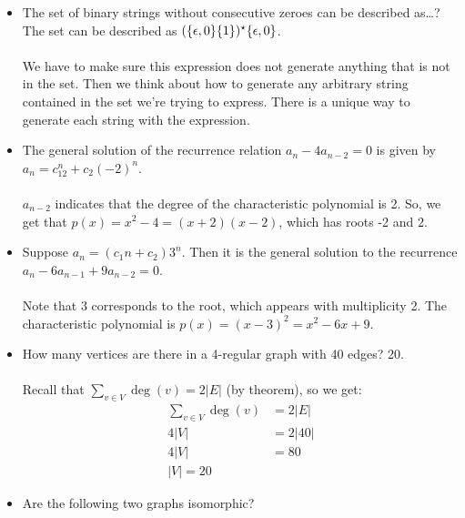 \documentclass[]{article}
\theoremstyle{definition}
\newcommand{\lecture}[1]{\marginpar{{\footnotesize $\leftarrow$ \underline{#1}}}}
\DeclarePairedDelimiter{\set}{\lbrace}{\rbrace}
\begin{document}
\begin{itemize}
			\item The set of binary strings without consecutive zeroes can be described as\dots? The set can be described as $(\set{\epsilon, 0}\set{1 })^\star \set{\epsilon, 0 }$.
				\\ \\
				We have to make sure this expression does not generate anything that is not in the set. Then we think about how to generate any arbitrary string contained in the set we're trying to express. There is a unique way to generate each string with the expression.
			\item \lecture{February 27, 2013} The general solution of the recurrence relation $a_n - 4a_{n - 2} = 0$ is given by $a_n = c_12^n + c_2(-2)^n$.
				\\ \\
				$a_{n - 2}$ indicates that the degree of the characteristic polynomial is 2. So, we get that $p(x) = x^2 - 4 = (x + 2)(x - 2)$, which has roots -2 and 2.
			\item Suppose $a_n = (c_1n + c_2)3^n$. Then it is the general solution to the recurrence $a_n - 6a_{n-1} + 9a_{n-2} = 0$.
				\\ \\
				Note that 3 corresponds to the root, which appears with multiplicity 2. The characteristic polynomial is $p(x) = (x-3)^2 = x^2 - 6x + 9$.
			\item How many vertices are there in a 4-regular graph with 40 edges? 20.
				\\ \\
				Recall that $\sum_{v \in V} \deg(v) = 2|E|$ (by theorem), so we get:
				\begin{align*}
					\sum_{v \in V} \deg(v) &= 2|E| \\
					4|V| &= 2|40| \\
					4|V| &= 80 \\
					|V| = 20
				\end{align*}
			\item Are the following two graphs isomorphic?
				\begin{center}
\end{center}
\end{itemize}
\end{document}
